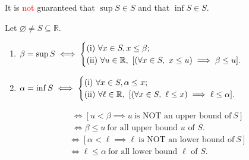\documentclass[11pt,openany]{article}
\begin{document}
\begin{remark*}[\textcolor{red}{\bf Caution!}]
	It is \textcolor{red}{not} guaranteed that $\sup S\in S$ and that $\inf S\in S$.
\end{remark*}
\begin{remark*}
	Let $\varnothing\neq S\subseteq\mathbb{R}$. \begin{enumerate}[(1)]
		\item $\beta=\sup S \iff\begin{cases}
			\text{(i)}\ \forall x\in S, x\leq\beta;\\
			\text{(ii)}\ \forall u\in\mathbb{R},\ [(\forall x\in S,\ x\leq u)\implies \beta\leq u].
		\end{cases}$
		\item $\alpha=\inf S \iff\begin{cases}
			\text{(i)}\ \forall x\in S, \alpha\leq x;\\
			\text{(ii)}\ \forall \ell\in\mathbb{R},\ [(\forall x\in S,\ \ell\leq x)\implies \ell\leq \alpha].
		\end{cases}$
	\end{enumerate} 
\end{remark*}
\begin{remark*}
	\begin{align*}
		[u\ \text{is any upper bound of}\ S\implies \beta\leq u]&\iff [u<\beta\implies u\ \text{is NOT an upper bound of}\ S]\\
		&\iff \beta\leq u\ \text{for all upper bound $u$ of $S$}.
	\end{align*}
	\begin{align*}
		[\ell\ \text{is any lower bound of}\ S\implies \ell\leq\alpha]&\iff [\alpha<\ell\implies\ell\ \text{is NOT an lower bound of}\ S]\\
		&\iff \ell\leq \alpha\ \text{for all lower bound $\ell$ of $S$}.
	\end{align*}
\end{remark*}
\newpage
\end{document}

